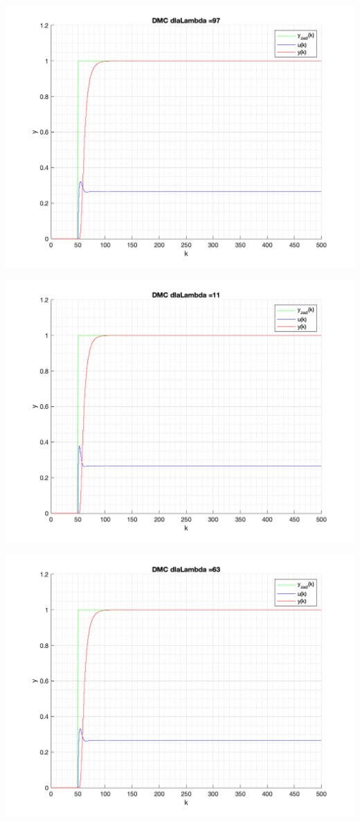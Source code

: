 \documentclass[a4paper, 11pt]{article}
\begin{document}
\begin{enumerate}
 \includegraphics[width=\linewidth]{./ModelsP4_Lambda/P4_DMC_Lambda_97_png.png} 
 
 \includegraphics[width=\linewidth]{./ModelsP4_Lambda/P4_DMC_Lambda_11_png.png} 
 
 \includegraphics[width=\linewidth]{./ModelsP4_Lambda/P4_DMC_Lambda_63_png.png} 
 

\end{enumerate}
\end{document}
